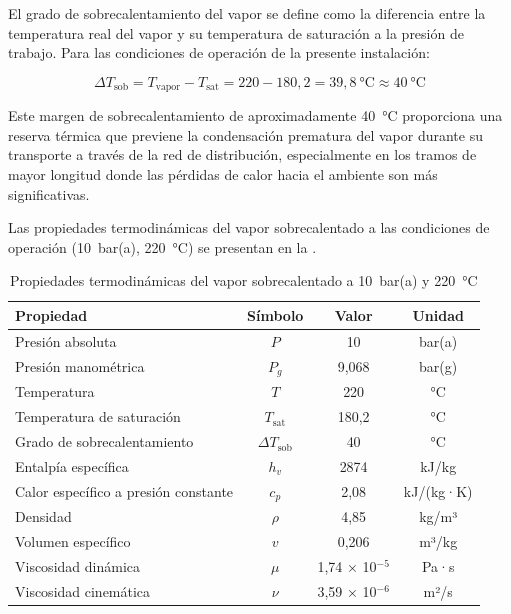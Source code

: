 El grado de sobrecalentamiento del vapor se define como la diferencia entre la temperatura real del vapor y su temperatura de saturación a la presión de trabajo. Para las condiciones de operación de la presente instalación:

\begin{equation}
	\Delta T_{\text{sob}} = T_{\text{vapor}} - T_{\text{sat}} = 220 - 180{,}2 = 39{,}8 \ \text{°C} \approx 40 \ \text{°C}
	\label{eq:grado-sobrecalentamiento}
\end{equation}

Este margen de sobrecalentamiento de aproximadamente 40~°C proporciona una reserva térmica que previene la condensación prematura del vapor durante su transporte a través de la red de distribución, especialmente en los tramos de mayor longitud donde las pérdidas de calor hacia el ambiente son más significativas.

Las propiedades termodinámicas del vapor sobrecalentado a las condiciones de operación (10~bar(a), 220~°C) se presentan en la .

\begin{table}[H]
	\centering
	\caption{Propiedades termodinámicas del vapor sobrecalentado a 10~bar(a) y 220~°C}
	\label{tab:propiedades-vapor-sobrecalentado}
	\begin{tabular}{lccc}
		\toprule
		\textbf{Propiedad}                   & \textbf{Símbolo}        & \textbf{Valor}   & \textbf{Unidad} \\
		\midrule
		Presión absoluta                     & $P$                     & 10               & bar(a)          \\
		Presión manométrica                  & $P_g$                   & 9,068            & bar(g)          \\
		Temperatura                          & $T$                     & 220              & °C              \\
		Temperatura de saturación            & $T_{\text{sat}}$        & 180,2            & °C              \\
		Grado de sobrecalentamiento          & $\Delta T_{\text{sob}}$ & 40               & °C              \\
		Entalpía específica                  & $h_v$                   & 2874             & kJ/kg           \\
		Calor específico a presión constante & $c_p$                   & 2,08             & kJ/(kg·K)       \\
		Densidad                             & $\rho$                  & 4,85             & kg/m³           \\
		Volumen específico                   & $v$                     & 0,206            & m³/kg           \\
		Viscosidad dinámica                  & $\mu$                   & 1,74 × 10$^{-5}$ & Pa·s            \\
		Viscosidad cinemática                & $\nu$                   & 3,59 × 10$^{-6}$ & m²/s            \\
		\bottomrule
	\end{tabular}
\end{table}

